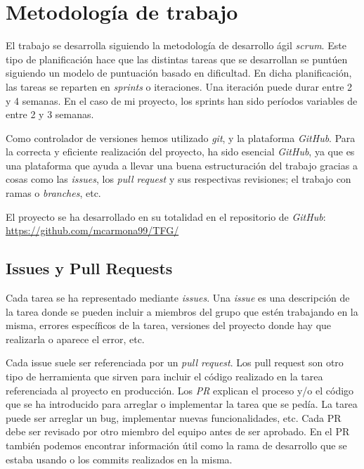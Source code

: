 \section{Metodología de trabajo}

El trabajo se desarrolla siguiendo la metodología de desarrollo ágil \textit{scrum}. Este tipo de planificación hace que las distintas tareas que se desarrollan se puntúen siguiendo un modelo de puntuación basado en dificultad. En dicha planificación, las tareas se reparten en \textit{sprints} o iteraciones. Una iteración puede durar entre 2 y 4 semanas. En el caso de mi proyecto, los sprints han sido períodos variables de entre 2 y 3 semanas. \newline

Como controlador de versiones hemos utilizado \textit{git}, y la plataforma \textit{GitHub}.
Para la correcta y eficiente realización del proyecto, ha sido esencial \textit{GitHub}, ya que es una plataforma que ayuda a llevar una buena estructuración del trabajo gracias a cosas como las \textit{issues}, los \textit{pull request} y sus respectivas revisiones; el trabajo con ramas o \textit{branches}, etc. \newline

	El proyecto se ha desarrollado en su totalidad en el repositorio de \textit{GitHub}: \color{blue} \href{https://github.com/mcarmona99/TFG/}{https://github.com/mcarmona99/TFG/} \color{black}
	
\subsection{Issues y Pull Requests}

Cada tarea se ha representado mediante \textit{issues}. Una \textit{issue} es una descripción de la tarea donde se pueden incluir a miembros del grupo que estén trabajando en la misma, errores específicos de la tarea, versiones del proyecto donde hay que realizarla o aparece el error, etc. \newline

Cada issue suele ser referenciada por un \textit{pull request}. Los pull request son otro tipo de herramienta que sirven para incluir el código realizado en la tarea referenciada al proyecto en producción. Los \textit{PR} explican el proceso y/o el código que se ha introducido para arreglar o implementar la tarea que se pedía. La tarea puede ser arreglar un bug, implementar nuevas funcionalidades, etc. Cada PR debe ser revisado por otro miembro del equipo antes de ser aprobado. En el PR también podemos encontrar información útil como la rama de desarrollo que se estaba usando o los commits realizados en la misma.
\newline

